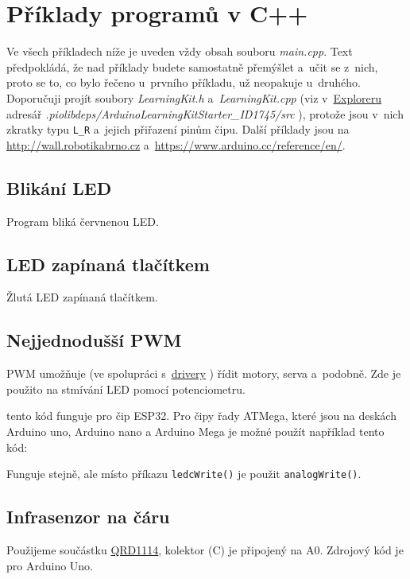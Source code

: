 

\section{Příklady programů v C++}   \label{cpppr}

Ve všech příkladech níže je uveden vždy obsah souboru {\it main.cpp}. 
Text předpokládá, že nad příklady budete samostatně přemýšlet a~učit se z~nich, proto se to, co bylo řečeno u~prvního příkladu, už neopakuje u~druhého.  
Doporučuji projít soubory {\it LearningKit.h}
a~{\it LearningKit.cpp} (viz v~\hyperlink{explorer}{Exploreru}
adresář {\it .piolibdeps/ArduinoLearningKitStarter\_ID1745/src} ), protože jsou v~nich zkratky typu {\tt L\_R} a~jejich přiřazení pinům čipu.
Další příklady jsou na \url{http://wall.robotikabrno.cz} a~\url{https://www.arduino.cc/reference/en/}.  

\label{cpppr1} \subsection{Blikání LED} 

Program bliká červnenou LED.   




\label{cpppr2} \subsection{LED zapínaná tlačítkem} 

Žlutá LED zapínaná tlačítkem.  




\label{cpppr3} \subsection{Nejjednodušší PWM} 

PWM  umožňuje (ve spolupráci
s~\hyperref[driver]{drivery} ) řídit motory, serva a~podobně. Zde je použito na stmívání LED pomocí potenciometru.  %




tento kód funguje pro čip ESP32. Pro čipy řady ATMega, které jsou na deskách Arduino uno, Arduino nano a Arduino Mega je možné použít například tento kód: 


 
Funguje stejně, ale místo příkazu {\tt ledcWrite()} je použit {\tt analogWrite()}.

\subsection{Infrasenzor na čáru} \label{prog:qrd1114}

Použijeme součástku \hyperref[qrd1114]{QRD1114}, kolektor (C) je připojený na A0. Zdrojový kód je pro Arduino Uno. 

